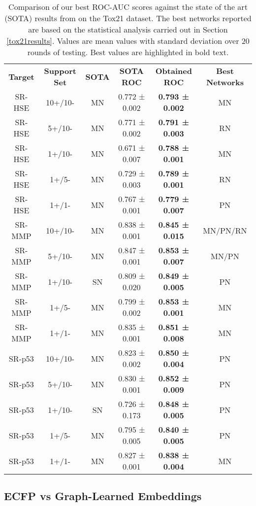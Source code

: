 \begin{table}[ht]
	\centering
	\begin{tabular}{@{}cccccc@{}}
	\textbf{Target} & \textbf{Support Set} & \textbf{SOTA} & \textbf{SOTA ROC} & \textbf{Obtained ROC} & \textbf{Best Networks} \\
	SR-HSE & 10+/10- & MN & 0.772 ± 0.002 & \textbf{0.793 ± 0.002} & MN \\
	SR-HSE & 5+/10- & MN & 0.771 ± 0.002 & \textbf{0.791 ± 0.003} & RN \\
	SR-HSE & 1+/10- & MN & 0.671 ± 0.007 & \textbf{0.788 ± 0.001} & MN \\
	SR-HSE & 1+/5- & MN & 0.729 ± 0.003 & \textbf{0.789 ± 0.001} & RN \\
	SR-HSE & 1+/1- & MN & 0.767 ± 0.001 & \textbf{0.779 ± 0.007} & PN \\
	SR-MMP & 10+/10- & MN & 0.838 ± 0.001 & \textbf{0.845 ± 0.015} & MN/PN/RN \\
	SR-MMP & 5+/10- & MN & 0.847 ± 0.001 & \textbf{0.853 ± 0.007} & MN/PN \\
	SR-MMP & 1+/10- & SN & 0.809 ± 0.020 & \textbf{0.849 ± 0.005} & PN \\
	SR-MMP & 1+/5- & MN & 0.799 ± 0.002 & \textbf{0.853 ± 0.001} & MN \\
	SR-MMP & 1+/1- & MN & 0.835 ± 0.001 & \textbf{0.851 ± 0.008} & MN \\
	SR-p53 & 10+/10- & MN & 0.823 ± 0.002 & \textbf{0.850 ± 0.004} & PN \\
	SR-p53 & 5+/10- & MN & 0.830 ± 0.001 & \textbf{0.852 ± 0.009} & PN \\
	SR-p53 & 1+/10- & SN & 0.726 ± 0.173 & \textbf{0.848 ± 0.005} & PN \\
	SR-p53 & 1+/5- & MN & 0.795 ± 0.005 & \textbf{0.840 ± 0.005} & PN \\
	SR-p53 & 1+/1- & MN & 0.827 ± 0.001 & \textbf{0.838 ± 0.004} & MN \\
	\end{tabular}
	\caption[Comparing our best ROC-AUC scores with the SOTA results on Tox21.]{Comparison of our best ROC-AUC scores against the state of the art (SOTA) results from \citet{altae2017low} on the Tox21 dataset. The best networks reported are based on the statistical analysis carried out in Section \ref{tox21results}. Values are mean values with standard deviation over 20 rounds of testing. Best values are highlighted in bold text.}
	\label{table:Tox21-sota-ours}
\end{table}

\subsection{ECFP vs Graph-Learned Embeddings}

